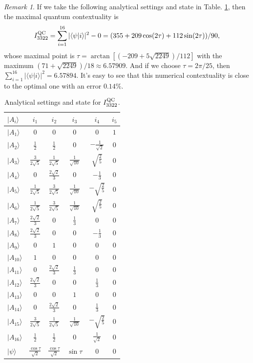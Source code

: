 \documentclass[pra,aps,notitlepage,superscriptaddress,showpacs,showkeys]{revtex4-1}
\theoremstyle{definition}
\theoremstyle{remark}
\newtheorem{remark}{Remark}
\begin{document}
\begin{remark}
If we take the following analytical settings and state in Table. \ref{analytical}, then  the maximal quantum contextuality is 
\[
I_{3322}^{\rm QC} = \sum_{i=1}^{16} |\langle \psi|i\rangle|^2 -0= (355+209\cos(2\tau)+112\sin(2\tau))/90,
\]
whose maximal point is $\tau = \arctan[(-209 + 5 \sqrt{2249})/112]$ with the maximum $\left(71+\sqrt{2249}\right)/18 \approx 6.57909$.
And if we choose $\tau = 2\pi/25$, then $\sum_{i=1}^{16} |\langle \psi|i\rangle|^2 = 6.57894$. It's easy to see that this numerical contextuality is close to the optimal one with an error $0.14 \%$.
\begin{table}[h]
\centering
  \begin{tabular}{lccccc} \hline \hline
$|A_i\rangle$ & $i_1$ & $i_2$ & $i_3$ & $i_4$ & $i_5$ \\
\hline
$|A_1\rangle$  & $0$ & $0$ & $0$ & $0$ & $1$ \\
$|A_2\rangle$  & $\frac{1}{2}$ & $\frac{1}{2}$ & $0$ & $-\frac{1}{\sqrt{2}}$ & $0$ \\
$|A_3\rangle$  & $\frac{3}{2 \sqrt{5}}$ & $\frac{1}{2 \sqrt{5}}$ & $\frac{1}{\sqrt{10}}$ & $\sqrt{\frac{2}{5}}$ & $0$ \\
$|A_4\rangle$  & $0$ & $\frac{2 \sqrt{2}}{3}$ & $0$ & $-\frac{1}{3}$ & $0$ \\
$|A_5\rangle$  & $\frac{1}{2 \sqrt{5}}$ & $\frac{3}{2 \sqrt{5}}$ & $\frac{1}{\sqrt{10}}$ & $-\sqrt{\frac{2}{5}}$ & $0$ \\
$|A_6\rangle$  & $\frac{1}{2 \sqrt{5}}$ & $\frac{3}{2 \sqrt{5}}$ & $\frac{1}{\sqrt{10}}$ & $\sqrt{\frac{2}{5}}$ & $0$ \\
$|A_7\rangle$  & $\frac{2 \sqrt{2}}{3}$ & $0$ & $\frac{1}{3}$ & $0$ & $0$ \\ 
$|A_8\rangle$  & $\frac{2 \sqrt{2}}{3}$ & $0$ & $0$ & $-\frac{1}{3}$ & $0$ \\
$|A_9\rangle$  & $0$ & $1$ & $0$ & $0$ & $0$ \\
$|A_{10}\rangle$ & $1$ & $0$ & $0$ & $0$ & $0$ \\
$|A_{11}\rangle$ & $0$ & $\frac{2 \sqrt{2}}{3}$ & $\frac{1}{3}$ & $0$ & $0$ \\
$|A_{12}\rangle$ & $\frac{2 \sqrt{2}}{3}$ & $0$ & $0$ & $\frac{1}{3}$ & $0$ \\
$|A_{13}\rangle$ & $0$ & $0$ & $1$ & $0$ & $0$ \\
$|A_{14}\rangle$ & $0$ & $\frac{2 \sqrt{2}}{3}$ & $0$ & $\frac{1}{3}$ & $0$ \\
$|A_{15}\rangle$ & $\frac{3}{2 \sqrt{5}}$ & $\frac{1}{2 \sqrt{5}}$ & $\frac{1}{\sqrt{10}}$ & $-\sqrt{\frac{2}{5}}$ & $0$  \\
$|A_{16}\rangle$ & $\frac{1}{2}$ & $\frac{1}{2}$ & $0$ & $\frac{1}{\sqrt{2}}$ & $0$ \\
\hline
$|\psi\rangle$ & $\frac{\cos\tau}{\sqrt{2}}$ & $\frac{\cos\tau}{\sqrt{2}}$ & $\sin\tau$ & $0$ & $0$ \\
  \hline \hline
   \end{tabular}
\caption{Analytical settings and state for $I_{3322}^{\rm QC}$.}
\label{analytical}
\end{table}
\end{remark}
\end{document}
